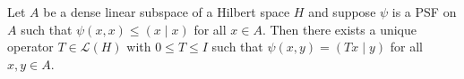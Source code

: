 Let $A$ be a dense linear subspace of a Hilbert space $H$ and suppose $\psi$ is a PSF on $A$ such that $\psi(x, x) \leq (x \mid x)$ for all $x \in A$. Then there exists a unique operator $T \in \mathcal{L}(H)$ with $0 \leq T \leq I$ such that $\psi(x, y) = (Tx \mid y)$ for all $x, y \in A$.

